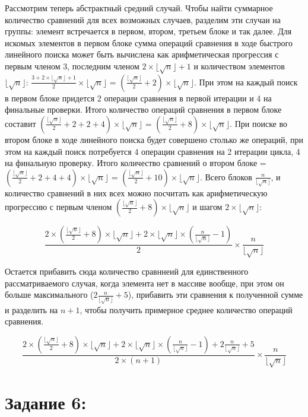 \documentclass[12pt]{article}
\begin{document}
{	Рассмотрим теперь абстрактный средний случай. Чтобы найти суммарное количество сравнений для всех возможных случаев, разделим эти случаи на группы: элемент встречается в первом, втором, третьем блоке и так далее. Для искомых элементов в первом блоке сумма операций сравнения в ходе быстрого линейного поиска может быть вычислена как арифметическая прогрессия с первым членом 3, последним членом $2\times\lfloor\sqrt{n}\rfloor + 1$ и количеством элементов $\lfloor\sqrt{n}\rfloor$: $\frac{3 + 2\times\lfloor\sqrt{n}\rfloor + 1}{2} \times \lfloor\sqrt{n}\rfloor$ = $(\frac{\lfloor\sqrt{n}\rfloor}{2} + 2) \times \lfloor\sqrt{n}\rfloor$. При этом на каждый поиск в первом блоке придется 2 операции сравнения в первой итерации и 4 на финальные проверки. Итого количество операций сравнения в первом блоке составит $(\frac{\lfloor\sqrt{n}\rfloor}{2} + 2 + 2 + 4) \times \lfloor\sqrt{n}\rfloor$ = $(\frac{\lfloor\sqrt{n}\rfloor}{2} + 8) \times \lfloor\sqrt{n}\rfloor$. При поиске во втором блоке в ходе линейного поиска будет совершено столько же операций, при этом на каждый поиск потребуется 4 операции сравнения на 2 итерации цикла, 4 на финальную проверку. Итого количество сравнений о втором блоке = $(\frac{\lfloor\sqrt{n}\rfloor}{2} + 2 + 4 + 4) \times \lfloor\sqrt{n}\rfloor$ = $(\frac{\lfloor\sqrt{n}\rfloor}{2} + 10) \times \lfloor\sqrt{n}\rfloor$. Всего блоков $\frac{n}{\lfloor\sqrt{n}\rfloor}$, и количество сравнений в них всех можно посчитать как арифметическую прогрессию с первым членом $(\frac{\lfloor\sqrt{n}\rfloor}{2} + 8) \times \lfloor\sqrt{n}\rfloor$ и шагом $2\times\lfloor\sqrt{n}\rfloor$:
	
	$$\frac{2\times(\frac{\lfloor\sqrt{n}\rfloor}{2} + 8) \times \lfloor\sqrt{n}\rfloor + 2\times\lfloor\sqrt{n}\rfloor \times (\frac{n}{\lfloor\sqrt{n}\rfloor} - 1)}{2} \times \frac{n}{\lfloor\sqrt{n}\rfloor}$$
	
	Остается прибавить сюда количество сравннеий для единственного рассматриваемого случая, когда элемента нет в массиве вообще, при этом он больше максимального ($2\frac{n}{\lfloor\sqrt{n}\rfloor} + 5$), прибавить эти сравнения к полученной сумме и разделить на $n+1$, чтобы получить примерное среднее количество операций сравнения.
	
	$$\frac{2\times(\frac{\lfloor\sqrt{n}\rfloor}{2} + 8) \times \lfloor\sqrt{n}\rfloor + 2\times\lfloor\sqrt{n}\rfloor \times (\frac{n}{\lfloor\sqrt{n}\rfloor} - 1) + 2\frac{n}{\lfloor\sqrt{n}\rfloor} + 5}{2\times (n+1)} \times \frac{n}{\lfloor\sqrt{n}\rfloor}$$
	
	\section{Задание 6:}
	\label{task_6}
	
}
\end{document}
